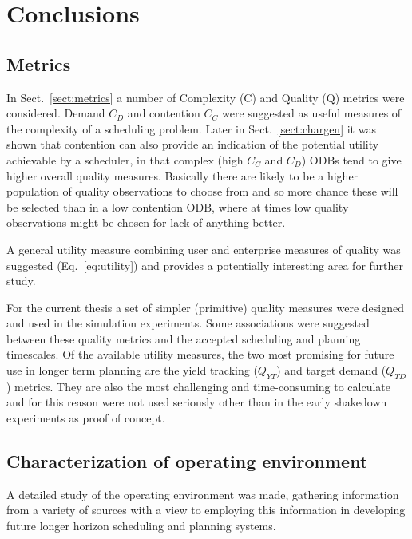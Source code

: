\section{Conclusions}
\label{sect:conclusions}



\subsection{Metrics}
 In Sect.~\ref{sect:metrics} a number of Complexity (C) and Quality (Q) metrics were considered. Demand $C_D$ and contention $C_C$ were suggested as useful measures of the complexity of a scheduling problem. Later in Sect.~\ref{sect:chargen} it was shown that contention can also provide an indication of the potential utility achievable by a scheduler, in that complex (high $C_C$ and $C_D$) ODBs tend to give higher overall quality measures. Basically there are likely to be a higher population of quality observations to choose from and so more chance these will be selected than in a low contention ODB, where at times low quality observations might be chosen for lack of anything better.

 A general utility measure combining user and enterprise measures of quality was suggested (Eq.~\ref{eq:utility}) and provides a potentially interesting area for further study. 

For the current thesis a set of simpler (primitive) quality measures were designed and used in the simulation experiments. Some associations were suggested between these quality metrics and the accepted scheduling and planning timescales. Of the available utility measures, the two most promising for future use in longer term planning are the yield tracking ($Q_{YT}$) and target demand ($Q_{TD}$) metrics. They are also the most challenging and time-consuming to calculate and for this reason were not used seriously other than in the early shakedown experiments as proof of concept. 

\subsection{Characterization of operating environment}
 A detailed study of the operating environment was made, gathering information from a variety of sources with a view to employing this information in developing future longer horizon scheduling and planning systems. 

